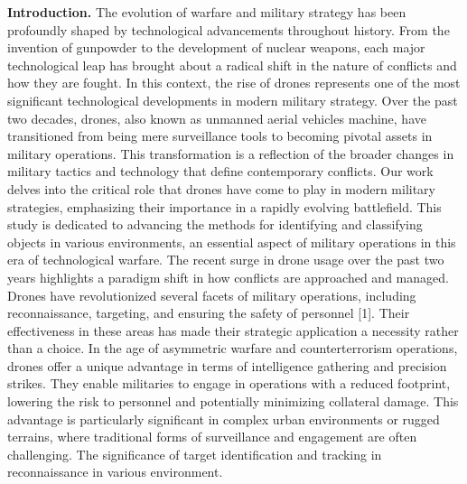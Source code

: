 \begin{multicols}{2}
{\bfseries Introduction.} The evolution of warfare and military strategy
has been profoundly shaped by technological advancements throughout
history. From the invention of gunpowder to the development of nuclear
weapons, each major technological leap has brought about a radical shift
in the nature of conflicts and how they are fought. In this context, the
rise of drones represents one of the most significant technological
developments in modern military strategy. Over the past two decades,
drones, also known as unmanned aerial vehicles machine, have
transitioned from being mere surveillance tools to becoming pivotal
assets in military operations. This transformation is a reflection of
the broader changes in military tactics and technology that define
contemporary conflicts. Our work delves into the critical role that
drones have come to play in modern military strategies, emphasizing
their importance in a rapidly evolving battlefield. This study is
dedicated to advancing the methods for identifying and classifying
objects in various environments, an essential aspect of military
operations in this era of technological warfare. The recent surge in
drone usage over the past two years highlights a paradigm shift in how
conflicts are approached and managed. Drones have revolutionized several
facets of military operations, including reconnaissance, targeting, and
ensuring the safety of personnel {[}1{]}. Their effectiveness in these
areas has made their strategic application a necessity rather than a
choice. In the age of asymmetric warfare and counterterrorism
operations, drones offer a unique advantage in terms of intelligence
gathering and precision strikes. They enable militaries to engage in
operations with a reduced footprint, lowering the risk to personnel and
potentially minimizing collateral damage. This advantage is particularly
significant in complex urban environments or rugged terrains, where
traditional forms of surveillance and engagement are often challenging.
The significance of target identification and tracking in reconnaissance
in various environment.


\end{multicols}
